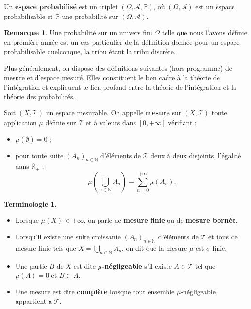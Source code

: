 \documentclass[french]{article}
\renewcommand{\P}{\mathbb{P}}
\newcommand{\N}{\mathbb{N}}
\newcommand{\R}{\mathbb{R}}
\theoremstyle{plain}
\theoremstyle{definition}
\newtheorem*{rmq}{Remarque}
\newtheorem*{terminologie}{Terminologie}
\theoremstyle{remark}
\begin{document}
\begin{dfn}
	Un \textbf{espace probabilisé} est un triplet $(\Omega,\mathcal{A},\P)$, où $(\Omega,\mathcal{A})$ est un espace probabilisable et $\P$ une probabilité sur $(\Omega,\mathcal{A})$.
\end{dfn}

\begin{rmq}
	Une probabilité sur un univers fini $\Omega$ telle que nous l'avons définie en première année est un cas particulier de la définition donnée pour un espace probabilisable quelconque, la tribu étant la tribu discrète.
\end{rmq}

Plus généralement, on dispose des définitions suivantes (hors programme) de mesure et d'espace mesuré. Elles constituent le bon cadre à la théorie de l'intégration et expliquent le lien profond entre la théorie de l'intégration et la théorie des probabilités.

\begin{dfn}[Mesure (HP)]
	Soit $(X,\mathcal{T})$ un espace mesurable. On appelle \textbf{mesure} sur $(X,\mathcal{T})$ toute application $\mu$ définie sur $\mathcal{T}$ et à valeurs dans $[0,+\infty]$ vérifiant :
	\begin{itemize}
		\item $\mu(\emptyset)=0$ ;
		\item pour toute suite $(A_n)_{n\in\N}$ d'éléments de $\mathcal{T}$ deux à deux disjoints, l'égalité dans $\overline{\R}_+$ :
		$$\mu\left(\bigcup_{n\in\N}A_n\right)=\sum_{n=0}^{+\infty}\mu(A_n).$$
	\end{itemize}
\end{dfn}

\begin{terminologie}
	\begin{itemize}
		\item Lorsque $\mu(X)<+\infty$, on parle de \textbf{mesure finie} ou de \textbf{mesure bornée}.
		\item Lorsqu'il existe une suite croissante $(A_n)_{n\in\N}$ d'éléments de $\mathcal{T}$ et tous de mesure finie tels que $X=\displaystyle\bigcup_{n\in\N}A_n$, on dit que la mesure $\mu$ est $\sigma$-finie.
		\item Une partie $B$ de $X$ est dite \textbf{$\mu$-négligeable} s'il existe $A\in\mathcal{T}$ tel que $\mu(A)=0$ et $B\subset A$.
		\item Une mesure est dite \textbf{complète} lorsque tout ensemble $\mu$-négligeable appartient à $\mathcal{T}$.
	\end{itemize}
\end{terminologie}
\end{document}
